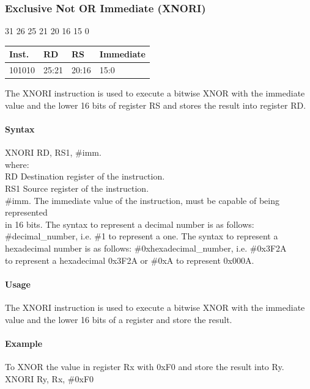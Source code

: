 \documentclass[12pt]{article}
\newcommand{\iTypeInstruction}[6]
{%
    \hspace{1.6cm}31 \hspace{1.15cm}26 \hspace{.05cm}25 \hspace{.8cm}21 \hspace{.05cm}20 \hspace{.8cm}16 \hspace{.05cm}15 \hspace{6.4cm}0
    \vspace{-.25cm}
    \begin{center}
        \begin{tabular}{ |p{1.8cm}|p{1.5cm}|p{1.5cm}|p{6.8cm}| }
            \hline
            \textbf{Inst.} & \textbf{RD} &  \textbf{RS} & \textbf{Immediate}\\
            \hline
            #1 & 25:21 & 20:16 &15:0\\
            \hline
        \end{tabular}
    \end{center}
    
    \noindent
    #2
    
    \paragraph{Syntax}
    \begin{flushleft}
    #3 RD, RS1, \#imm.\\
    \vspace{1em}        %
    where:\\
    \vspace{1em}
    RD  \hspace{3.6em} Destination register of the instruction.\\
    \vspace{1em}
    RS1  \hspace{3.35em} Source register of the instruction.\\
    \vspace{1em}
    \#imm.  \hspace{1.8em} The immediate value of the instruction, must be capable of being represented\\             \hspace{5.4em} in 16 bits. The syntax to represent a decimal number is as follows:\\
            \hspace{5.4em} \#decimal\_number, i.e. \#1 to represent a one. The syntax to represent a\\
            \hspace{5.4em} hexadecimal number is as follows: \#0xhexadecimal\_number, i.e. \#0x3F2A \\
            \hspace{5.4em} to represent a hexadecimal 0x3F2A or \#0xA to represent 0x000A.\\
    \end{flushleft}
    
    \paragraph{Usage}
    \begin{flushleft}
    #4\\
    \end{flushleft}
    \paragraph{Example}
    \begin{flushleft}
    #5\\
    \vspace{1em}
    #6
    \end{flushleft}}
\begin{document}

    \newpage
    \subsubsection{Exclusive Not OR Immediate (XNORI)}
    
    \iTypeInstruction
    {101010}
    {The XNORI instruction is used to execute a bitwise XNOR with the immediate value and the lower 16 bits of register RS and stores the result into register RD.}
    {XNORI}
    {The XNORI instruction is used to execute a bitwise XNOR with the immediate value and the lower 16 bits of a register and store the result.}
    {To XNOR the value in register Rx with 0xF0 and store the result into Ry.}
    {XNORI Ry, Rx, \#0xF0}
    
    
    
\end{document}
